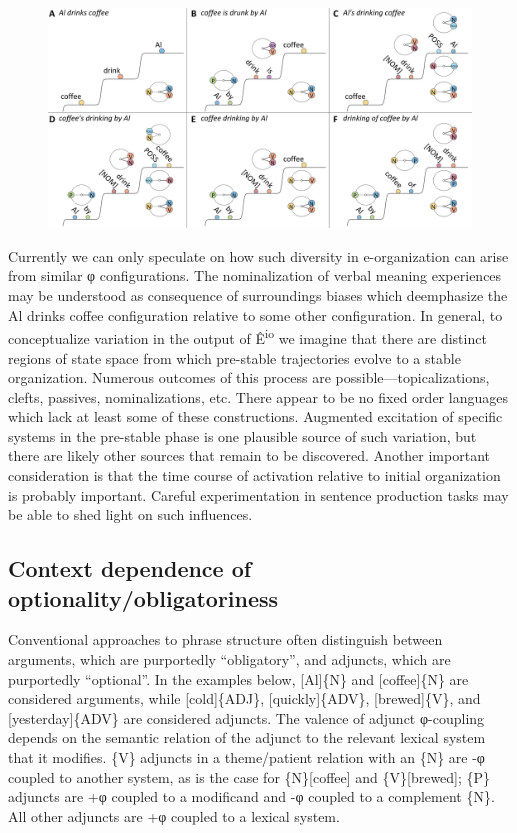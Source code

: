   
\begin{figure}
\includegraphics[width=\textwidth]{figures/Tilsen-img82.png}
\caption{\missingcaption}
\label{fig:}
\end{figure}
 

  Currently we can only speculate on how such diversity in e-organization can arise from similar φ configurations. The nominalization of verbal meaning experiences may be understood as consequence of surroundings biases which deemphasize the {\textbar}Al drinks coffee{\textbar} configuration relative to some other configuration. In general, to conceptualize variation in the output of Ê\textsuperscript{io} we imagine that there are distinct regions of state space from which pre-stable trajectories evolve to a stable organization. Numerous outcomes of this process are possible—topicalizations, clefts, passives, nominalizations, etc. There appear to be no fixed order languages which lack at least some of these constructions. Augmented excitation of specific systems in the pre-stable phase is one plausible source of such variation, but there are likely other sources that remain to be discovered. Another important consideration is that the time course of activation relative to initial organization is probably important. Careful experimentation in sentence production tasks may be able to shed light on such influences.

\subsection{Context dependence of optionality/obligatoriness}

Conventional approaches to phrase structure often distinguish between arguments, which are purportedly “obligatory”, and adjuncts, which are purportedly “optional”. In the examples below, [Al]\{N\} and [coffee]\{N\} are considered arguments, while [cold]\{ADJ\}, [quickly]\{ADV\}, [brewed]\{V\}, and [yesterday]\{ADV\} are considered adjuncts. The valence of adjunct φ-coupling depends on the semantic relation of the adjunct to the relevant lexical system that it modifies. \{V\} adjuncts in a theme/patient relation with an \{N\} are -φ coupled to another system, as is the case for \{N\}[coffee] and \{V\}[brewed]; \{P\} adjuncts are +φ coupled to a modificand and -φ coupled to a complement \{N\}. All other adjuncts are +φ coupled to a lexical system.

